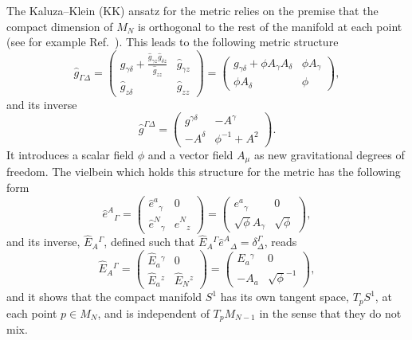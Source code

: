 \documentclass[aps,prd,12pt,superscriptaddress,showpacs,showkeys,longbibliography,reprint,nofootinbib]{revtex4-1}
\begin{document}
The Kaluza--Klein (KK) ansatz for the metric relies on the premise that the compact dimension of $M_N$ is orthogonal to the rest of the manifold at each point (see for example Ref.~\cite{Blagojevic:2002du}). This leads to the following metric structure
\begin{equation}
  \hat{g}_{\Gamma\Delta} =
  \begin{pmatrix}
    g_{\gamma\delta} +\frac{\hat{g}_{\gamma z}\hat{g}_{\delta z}}{\hat{g}_{zz}}&\hat{g}_{\gamma z}\\
    \hat{g}_{z\delta} & \hat{g}_{zz}
  \end{pmatrix}
  =
  \begin{pmatrix}
    g_{\gamma\delta} + \phi A_\gamma A_\delta&\phi A_\gamma\\
    \phi A_{\delta} & \phi
  \end{pmatrix},
\end{equation}
and its inverse
\begin{equation}
  \hat{g}^{\Gamma\Delta}=
  \begin{pmatrix}
    g^{\gamma\delta}&-A^\gamma\\
    -A^{\delta} & \phi^{-1}+A^2
  \end{pmatrix}.
\end{equation}
It introduces a scalar field $\phi$ and a vector field $A_\mu$ as new gravitational degrees of freedom. The vielbein which holds this structure for the metric has the following form
\begin{equation}
  \label{Dvielbein}
  \hat{e}^A{}_{\Gamma} =
  \begin{pmatrix}
    \hat{e}^a{}_{\gamma}& 0\\
    \hat{e}^N{}_{\gamma} & \hat{e}^N{}_{z}
  \end{pmatrix}
  =
  \begin{pmatrix}
    e^a{}_{\gamma}& 0\\
    \sqrt{\phi}A_\gamma & \sqrt{\phi}
  \end{pmatrix},
\end{equation}
and its inverse, $\hat{E}_A{}^{\Gamma}$, defined such that $\hat{E}_A{}^{\Gamma}\hat{e}^A{}_{\Delta}=\delta^\Gamma_{\Delta}$, reads
\begin{equation}
  \label{Dinversevielbein}
  \hat{E}_A{}^{\Gamma} =
  \begin{pmatrix}
    \hat{E}_a{}^{\gamma}& 0\\
    \hat{E}_a{}^{z} & \hat{E}_N{}^{z}
  \end{pmatrix}
  =
  \begin{pmatrix}
    E_a{}^{\gamma}& 0\\
    -A_a & \sqrt{\phi}^{-1}
  \end{pmatrix},
\end{equation}
and it shows that the compact manifold $S^1$ has its own tangent space, $T_pS^1$, at each point $p\in M_N$, and is independent of $T_pM_{N-1}$ in the sense that they do not mix. %
\end{document}
